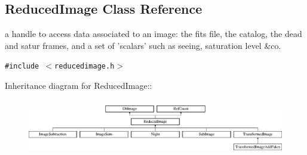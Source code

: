 \subsection{Reduced\-Image  Class Reference}
\label{class_reducedimage}
a handle to access data associated to an image: the fits file, the catalog, the dead and satur frames, and a set of 'scalars' such as seeing, saturation level \&co. 


{\tt \#include $<$reducedimage.h$>$}

Inheritance diagram for Reduced\-Image::\begin{figure}[H]
\begin{center}
\leavevmode
\includegraphics[height=2.47514cm]{class_reducedimage}
\end{center}
\end{figure}
